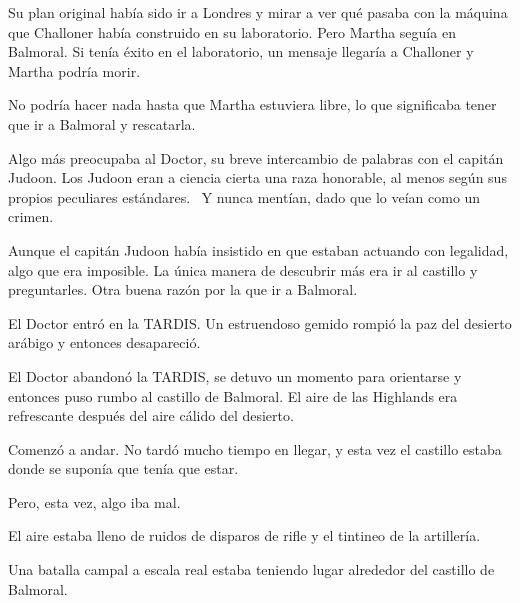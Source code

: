Su plan original había sido ir a Londres y mirar a ver qué pasaba con la
máquina que Challoner había construido en su laboratorio. Pero Martha
seguía en Balmoral. Si tenía éxito en el laboratorio, un mensaje
llegaría a Challoner y Martha podría morir.

No podría hacer nada hasta que Martha estuviera libre, lo que
significaba tener que ir a Balmoral y rescatarla.

Algo más preocupaba al Doctor, su breve intercambio de palabras con el
capitán Judoon. Los Judoon eran a ciencia cierta una raza honorable, al
menos según sus propios peculiares estándares. ~Y nunca mentían, dado
que lo veían como un crimen.

Aunque el capitán Judoon había insistido en que estaban actuando con
legalidad, algo que era imposible. La única manera de descubrir más era
ir al castillo y preguntarles. Otra buena razón por la que ir a
Balmoral.

El Doctor entró en la TARDIS. Un estruendoso gemido rompió la paz del
desierto arábigo y entonces desapareció.

El Doctor abandonó la TARDIS, se detuvo un momento para orientarse y
entonces puso rumbo al castillo de Balmoral. El aire de las Highlands
era refrescante después del aire cálido del desierto.

Comenzó a andar. No tardó mucho tiempo en llegar, y esta vez el castillo
estaba donde se suponía que tenía que estar.

Pero, esta vez, algo iba mal.

El aire estaba lleno de ruidos de disparos de rifle y el tintineo de la
artillería.

Una batalla campal a escala real estaba teniendo lugar alrededor del
castillo de Balmoral.